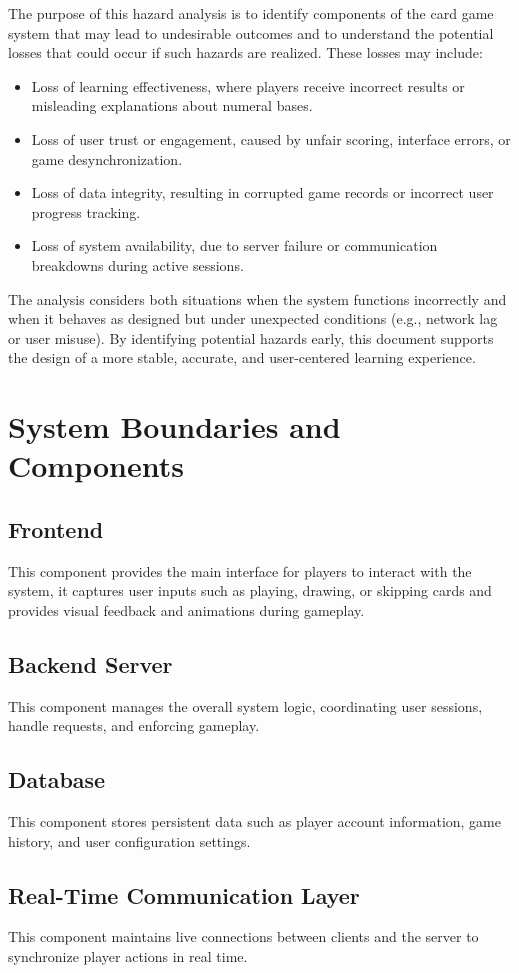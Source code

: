 \documentclass{article}
\begin{document}
The purpose of this hazard analysis is to identify components of the card game system that may lead to undesirable outcomes and to understand the potential losses that could occur if such hazards are realized. These losses may include:
\begin{itemize}
	\item Loss of learning effectiveness, where players receive incorrect results or misleading explanations about numeral bases.
	\item Loss of user trust or engagement, caused by unfair scoring, interface errors, or game desynchronization.
	\item Loss of data integrity, resulting in corrupted game records or incorrect user progress tracking.
	\item Loss of system availability, due to server failure or communication breakdowns during active sessions.
\end{itemize}
The analysis considers both situations when the system functions incorrectly and when it behaves as designed but under unexpected conditions (e.g., network lag or user misuse). By identifying potential hazards early, this document supports the design of a more stable, accurate, and user-centered learning experience.

\section{System Boundaries and Components}
\subsection{Frontend}
This component provides the main interface for players to interact with the system, it captures user inputs such as playing, drawing, or skipping cards and provides visual feedback and animations during gameplay.
\subsection{Backend Server}
This component manages the overall system logic, coordinating user sessions, handle requests, and enforcing gameplay.
\subsection{Database}
This component stores persistent data such as player account information, game history, and user configuration settings.
\subsection{Real-Time Communication Layer}
This component maintains live connections between clients and the server to synchronize player actions in real time.
\end{document}
